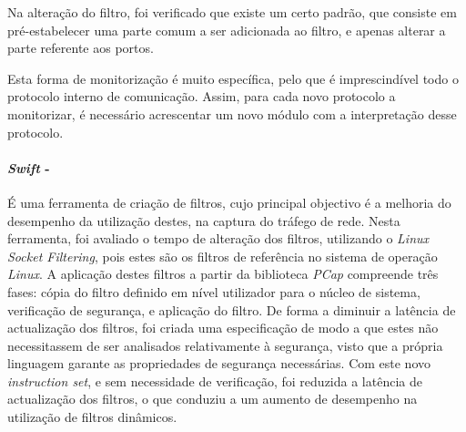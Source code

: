 Na alteração do filtro, foi verificado que existe um certo padrão, que consiste em pré-estabelecer uma parte comum a ser adicionada ao filtro, e apenas alterar a parte referente aos portos.

Esta forma de monitorização é muito específica, pelo que é imprescindível todo o protocolo interno de comunicação.
Assim, para cada novo protocolo a monitorizar, é necessário acrescentar um novo módulo com a interpretação desse protocolo.


\paragraph*{\textit{Swift} - }
É uma ferramenta de criação de filtros, cujo principal objectivo é a melhoria do desempenho da utilização destes, na captura do tráfego de rede.
Nesta ferramenta, foi avaliado o tempo de alteração dos filtros, utilizando o \textit{Linux Socket Filtering}, pois estes são os filtros de referência no sistema de operação \textit{Linux}.
A aplicação destes filtros a partir da biblioteca \textit{PCap} compreende três fases: cópia do filtro definido em nível utilizador para o núcleo de sistema, verificação de segurança, e aplicação do filtro.
De forma a diminuir a latência de actualização dos filtros, foi criada uma especificação de modo a que estes não necessitassem de ser analisados relativamente à segurança, visto que a própria linguagem garante as propriedades de segurança necessárias.
Com este novo \textit{instruction set}, e sem necessidade de verificação, foi reduzida a latência de actualização dos filtros, o que conduziu a um aumento de desempenho na utilização de filtros dinâmicos.










